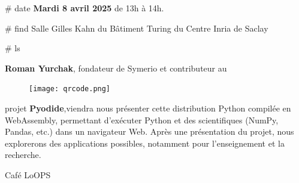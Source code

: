 \documentclass[final]{beamer}
\newlength{\twocolwid}
\begin{document}
\begin{frame}[t]
\begin{columns}[t]
\begin{column}{\twocolwid}
\begin{block}{\# date}
				 \textbf{Mardi 8 avril 2025} de 13h \`{a} 14h.

			\end{block}


			\begin{block}{\# find}
				 Salle Gilles Kahn du B\^{a}timent Turing du Centre Inria de Saclay
			\end{block}

			\begin{block}{\# ls}


				 \textbf{Roman Yurchak}, fondateur de Symerio et contributeur au

				\begin{figure}
					\centering
					\texttt{[image: qrcode.png]}
				\end{figure}

				projet \textbf{Pyodide},viendra nous pr\'{e}senter cette distribution Python
				compil\'{e}e
				en WebAssembly, permettant d'ex\'{e}cuter Python et des scientifiques
				(NumPy, Pandas, etc.) dans un navigateur Web.
				Apr\`{e}s une pr\'{e}sentation du projet, nous explorerons des applications
				possibles, notamment pour l’enseignement et la recherche.

				\vspace{2in}

			\end{block}












			\begin{alertblock}{\Large{Caf\'{e} LoOPS}}
			\end{alertblock}


\end{column}
\end{columns}
\end{frame}
\end{document}
